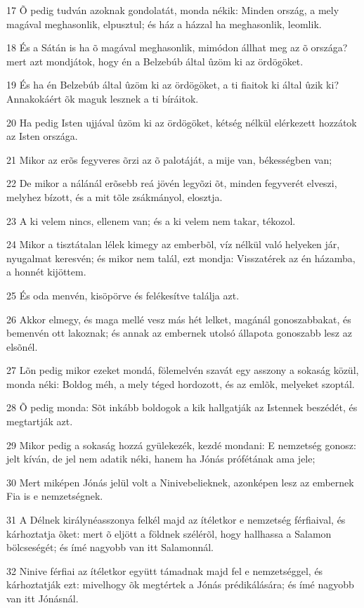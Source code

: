 \par 17 Õ pedig tudván azoknak gondolatát, monda nékik: Minden ország, a mely magával meghasonlik, elpusztul; és ház a házzal ha meghasonlik, leomlik.
\par 18 És a Sátán is ha õ magával meghasonlik, mimódon állhat meg az õ országa? mert azt mondjátok, hogy én a Belzebúb által ûzöm ki az ördögöket.
\par 19 És ha én Belzebúb által ûzöm ki az ördögöket, a ti fiaitok ki által ûzik ki? Annakokáért õk maguk lesznek a ti bíráitok.
\par 20 Ha pedig Isten ujjával ûzöm ki az ördögöket, kétség nélkül elérkezett hozzátok az Isten országa.
\par 21 Mikor az erõs fegyveres õrzi az õ palotáját, a mije van, békességben van;
\par 22 De mikor a nálánál erõsebb reá jövén legyõzi õt, minden fegyverét elveszi, melyhez bízott, és a mit tõle zsákmányol, elosztja.
\par 23 A ki velem nincs, ellenem van; és a ki velem nem takar, tékozol.
\par 24 Mikor a tisztátalan lélek kimegy az emberbõl, víz nélkül való helyeken jár, nyugalmat keresvén; és mikor nem talál, ezt mondja: Visszatérek az én házamba, a honnét kijöttem.
\par 25 És oda menvén, kisöpörve és felékesítve találja azt.
\par 26 Akkor elmegy, és maga mellé vesz más hét lelket, magánál gonoszabbakat, és bemenvén ott lakoznak; és annak az embernek utolsó állapota gonoszabb lesz az elsõnél.
\par 27 Lõn pedig mikor ezeket mondá, fölemelvén szavát egy asszony a sokaság közül, monda néki: Boldog méh, a mely téged hordozott, és az emlõk, melyeket szoptál.
\par 28 Õ pedig monda: Sõt inkább boldogok a kik hallgatják az Istennek beszédét, és megtartják azt.
\par 29 Mikor pedig a sokaság hozzá gyülekezék, kezdé mondani: E nemzetség gonosz: jelt kíván, de jel nem adatik néki, hanem ha Jónás prófétának  ama jele;
\par 30 Mert miképen Jónás jelül volt a Ninivebelieknek, azonképen lesz az embernek Fia is e nemzetségnek.
\par 31 A Délnek királynéasszonya felkél majd az ítéletkor e nemzetség férfiaival, és kárhoztatja õket: mert õ eljött a földnek szélérõl, hogy hallhassa a Salamon bölcseségét; és ímé nagyobb  van itt Salamonnál.
\par 32 Ninive férfiai az ítéletkor együtt támadnak majd fel e nemzetséggel, és kárhoztatják ezt: mivelhogy õk megtértek a Jónás prédikálására; és ímé nagyobb van itt  Jónásnál.
